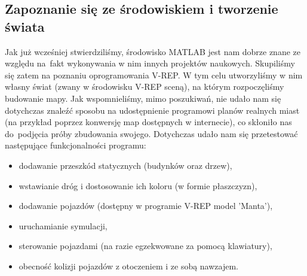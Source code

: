 \documentclass[11pt, a4paper, twoside]{article}
\begin{document}
	\subsection{Zapoznanie się ze środowiskiem i tworzenie świata}
	\label{subsec:scena}
	Jak już wcześniej stwierdziliśmy, środowisko MATLAB jest nam dobrze znane ze względu na~fakt wykonywania w nim innych projektów naukowych. Skupiliśmy się zatem na poznaniu oprogramowania V-REP. W tym celu utworzyliśmy w nim własny świat (zwany w środowisku \mbox{V-REP} sceną), na którym rozpoczęliśmy budowanie mapy. Jak wspomnieliśmy, mimo poszukiwań, nie udało nam się dotychczas znaleźć sposobu na udostępnienie programowi planów realnych miast (na przykład poprzez konwersję map dostępnych w internecie), co skłoniło nas do~podjęcia próby zbudowania swojego. Dotychczas udało nam się przetestować następujące funkcjonalności programu:
	\begin{itemize}
		\item dodawanie przeszkód statycznych (budynków oraz drzew),
		\item wstawianie dróg i dostosowanie ich koloru (w formie płaszczyzn),
		\item dodawanie pojazdów (dostępny w programie V-REP model 'Manta'),
		\item uruchamianie symulacji,
		\item sterowanie pojazdami (na razie egzekwowane za pomocą klawiatury),
		\item obecność kolizji pojazdów z otoczeniem i ze sobą nawzajem.
	\end{itemize}
	
\end{document}
